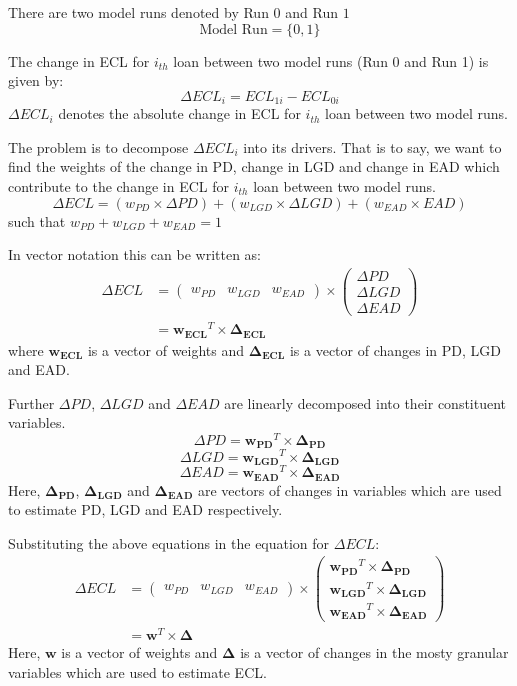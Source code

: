 \documentclass{article}
\begin{document}
There are two model runs denoted by Run $0$ and Run $1$
$$ \text{Model Run} = \{0,1\} $$

The change in ECL for $i_{th}$ loan between two model runs (Run 0  and Run 1) is given by:
$$ \Delta ECL_{i} = ECL_{1i} - ECL_{0i} $$
$\Delta ECL_i$ denotes the absolute change in ECL for $i_{th}$ loan between two model runs.

The problem is to decompose $\Delta ECL_i$ into its drivers. That is to say, we want to find the weights of the change in PD, change in LGD and change in EAD which contribute to the change in ECL for $i_{th}$ loan between two model runs.
$$ \Delta ECL = (w_{PD} \times \Delta PD) + (w_{LGD} \times \Delta LGD) + (w_{EAD} \times EAD) $$
such that $ w_{PD} + w_{LGD} + w_{EAD} = 1$

In vector notation this can be written as:
\begin{align*}
  \Delta ECL &=
  \begin{pmatrix}
    w_{PD} & w_{LGD} & w_{EAD} 
  \end{pmatrix}
  \times 
  \begin{pmatrix}
    \Delta PD \\ \Delta LGD \\ \Delta EAD
  \end{pmatrix} \\
  &= \mathbf{w_{ECL}}^T \times \mathbf{\Delta_{ECL}}
\end{align*}
where $\mathbf{w_{ECL}}$ is a vector of weights and $\mathbf{\Delta_{ECL}}$ is a vector of changes in PD, LGD and EAD.

Further $\Delta PD$, $\Delta LGD$ and $\Delta EAD$ are linearly decomposed into their constituent variables.
$$ \Delta PD = \mathbf{w_{PD}}^T \times \mathbf{\Delta_{PD}} $$
$$ \Delta LGD = \mathbf{w_{LGD}}^T \times \mathbf{\Delta_{LGD}} $$
$$ \Delta EAD = \mathbf{w_{EAD}}^T \times \mathbf{\Delta_{EAD}} $$
Here, $\mathbf{\Delta_{PD}}$, $\mathbf{\Delta_{LGD}}$ and $\mathbf{\Delta_{EAD}}$ are vectors of changes in variables which are used to estimate PD, LGD and EAD respectively.

Substituting the above equations in the equation for $\Delta ECL$:
\begin{align*}
  \Delta ECL &=
  \begin{pmatrix}
    w_{PD} & w_{LGD} & w_{EAD} 
  \end{pmatrix}
  \times 
  \begin{pmatrix}
    \mathbf{w_{PD}}^T \times \mathbf{\Delta_{PD}} \\ \mathbf{w_{LGD}}^T \times \mathbf{\Delta_{LGD}} \\ \mathbf{w_{EAD}}^T \times \mathbf{\Delta_{EAD}}
  \end{pmatrix} \\
  &= \mathbf{w}^T \times \mathbf{\Delta}
\end{align*}
Here, $\mathbf{w}$ is a vector of weights and $\mathbf{\Delta}$ is a vector of changes in the mosty granular variables which are used to estimate ECL.
\end{document}
